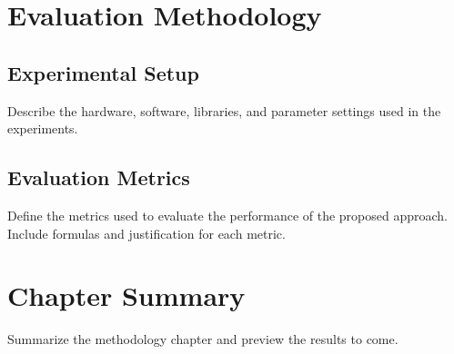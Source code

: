 \section{Evaluation Methodology}
\label{sec:evaluation}

\subsection{Experimental Setup}
\label{sec:exp-setup}

Describe the hardware, software, libraries, and parameter settings used
in the experiments.

\subsection{Evaluation Metrics}
\label{sec:metrics}

Define the metrics used to evaluate the performance of the proposed
approach. Include formulas and justification for each metric.

\section{Chapter Summary}
\label{sec:method-summary}

Summarize the methodology chapter and preview the results to come.
